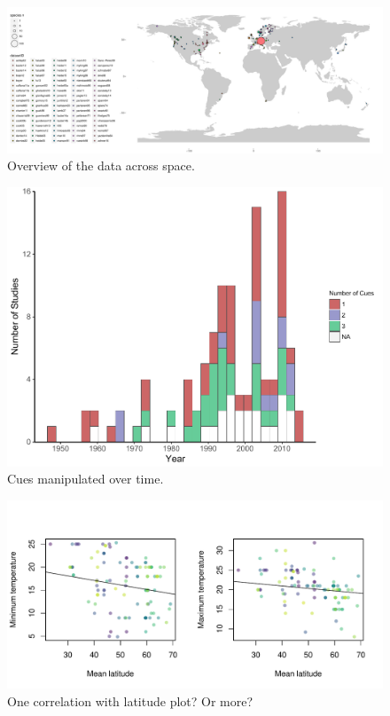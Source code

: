 \documentclass[11pt,letterpaper]{article}
\begin{document}
\newpage





\begin{figure}[t!]
\centering
\includegraphics[width=1\textwidth]{..//..//analyses/limitingcues/figures/maps/map_datasetID.pdf}
\caption{Overview of the data across space.}
  \label{fig:datamap}
\end{figure}
\clearpage

\begin{figure}[t!]
\centering
\includegraphics[width=1\textwidth]{..//..//analyses/limitingcues/figures/studyyearcues.pdf}
\caption{Cues manipulated over time.}
  \label{fig:ts}
\end{figure}
\clearpage

\begin{figure}[t!]
\centering
\includegraphics[width=1\textwidth]{..//..//analyses/limitingcues/figures/tempxlatminmaxcorr.pdf}
\caption{One correlation with latitude plot? Or more?}
  \label{fig:lat}
\end{figure}
\clearpage
\end{document}
